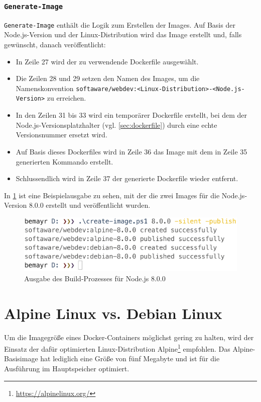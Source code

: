 \subsubsection{\texttt{Generate-Image}}
\verb|Generate-Image| enthält die Logik zum Erstellen der Images.
Auf Basis der Node.js-Version und der Linux-Distribution wird das Image erstellt und, falls gewünscht, danach veröffentlicht:
\begin{itemize}
    \item In Zeile 27 wird der zu verwendende Dockerfile ausgewählt.
    \item Die Zeilen 28 und 29 setzen den Namen des Images, um die Namenskonvention \verb|softaware/webdev:<Linux-Distribution>-<Node.js-Version>| zu erreichen.
    \item In den Zeilen 31 bis 33 wird ein temporärer Dockerfile erstellt, bei dem der Node.js-Versionsplatzhalter (vgl. \cref{sec:dockerfile}) durch eine echte Versionsnummer ersetzt wird.
    \item Auf Basis dieses Dockerfiles wird in Zeile 36 das Image mit dem in Zeile 35 generierten Kommando erstellt.
    \item Schlussendlich wird in Zeile 37 der generierte Dockerfile wieder entfernt.
\end{itemize}
In \cref{fig:create-image} ist eine Beispielausgabe zu sehen, mit der die zwei Images für die Node.js-Version 8.0.0 erstellt und veröffentlicht wurden.
\begin{figure}[htbp]
    \centering
    \includegraphics[width=0.75\linewidth,clip]{images/create-image}
    \caption{Ausgabe des Build-Prozesses für Node.js 8.0.0}
\label{fig:create-image}
\end{figure}

\section{Alpine Linux vs. Debian Linux}
\label{sec:alpine-vs-debian}
Um die Imagegröße eines Docker-Containers möglichst gering zu halten, wird der Einsatz der dafür optimierten Linux-Distribution Alpine\footnote{\url{https://alpinelinux.org/}} empfohlen.
Das Alpine-Basisimage hat lediglich eine Größe von fünf Megabyte und ist für die Ausführung im Hauptspeicher optimiert.

